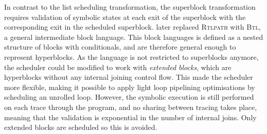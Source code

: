 In contrast to the list scheduling transformation, the superblock transformation
requires validation of symbolic states at each exit of the superblock with the
corresponding exit in the scheduled \gls{superblock}.
\textcite[]{gourdin23_fvopbs} later replaced \textsc{Rtlpath} with \textsc{Btl},
a general intermediate block language.  This block languages is defined as a
nested structure of blocks with conditionals, and are therefore general enough
to represent \glspl{hyperblock}.  As the language is not restricted to
superblocks anymore, the scheduler could be modified to work with \emph{extended
  blocks}, which are hyperblocks without any internal joining \gls{control
  flow}.  This made the scheduler more flexible, making it possible to apply
light loop pipelining optimisations by scheduling an unrolled loop.  However,
the symbolic execution is still performed on each trace through the program, and
no sharing between tracing takes place, meaning that the validation is
exponential in the number of internal joins.  Only extended blocks are scheduled
so this is avoided.







